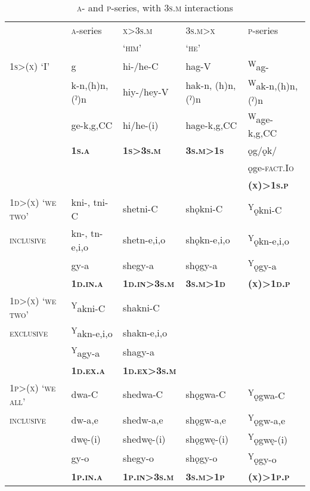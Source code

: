 \begin{table}
\caption{\textsc{a}- and \textsc{p}-series, with \textsc{3s.m} interactions}
\label{figtab:a,o,3s.m interactions}
\small
\begin{tabular}{lllll}
\lsptoprule
 & \textsc{a}-series & \textsc{x}>\textsc{3s.m} & \textsc{3s.m}>\textsc{x}  & \textsc{p}-series\\
 &  & \textsc{`him'} & \textsc{`he'} & \\
\midrule
\textsc{1s>(x) `I'} & g & hi-/he-C & hag-V & \textsuperscript{W}ag-\\
 & k-n,(h)n,(ˀ)n & hiy-/hey-V & hak-n, (h)n, (ˀ)n & \textsuperscript{W}ak-n,(h)n,(ˀ)n \\
 & ge-k,g,CC & hi/he-(i) & hage-k,g,CC & \textsuperscript{W}age-k,g,CC \\
 & \textbf{\textsc{1s.a}} & \textbf{\textsc{1s>3s.m}} & \textbf{\textsc{3s.m>1s}} & ǫg/ǫk/\\
  & & & & ǫge-\textsc{fact.Io}\\
 & & & & \textbf{\textsc{(x)>1s.p}}\\
\midrule
 \textsc{1d>(x) `we two'}& kni-, tni-C & shetni-C & shǫkni-C &  \textsuperscript{Y}ǫkni-C\\
\textsc{inclusive} & kn-, tn-e,i,o & shetn-e,i,o & shǫkn-e,i,o & \textsuperscript{Y}ǫkn-e,i,o \\
 & gy-a & shegy-a & shǫgy-a & \textsuperscript{Y}ǫgy-a\\
 & \textbf{\textsc{1d.in.a}} & \textbf{\textsc{1d.in>3s.m}} & \textbf{\textsc{3s.m>1d}} & \textbf{\textsc{(x)>1d.p}} \\
\cmidrule{1-3}
\textsc{1d>(x) `we two'} & \textsuperscript{Y}akni-C & shakni-C & & \\
\textsc{exclusive} & \textsuperscript{Y}akn-e,i,o & shakn-e,i,o & & \\
 & \textsuperscript{Y}agy-a & shagy-a & & \\
 & \textbf{\textsc{1d.ex.a}} & \textbf{\textsc{1d.ex>3s.m}} & & \\
\midrule
\textsc{1p>(x) `we all'} & dwa-C & shedwa-C & shǫgwa-C & \textsuperscript{Y}ǫgwa-C\\
\textsc{inclusive} & dw-a,e & shedw-a,e & shǫgw-a,e &
\textsuperscript{Y}ǫgw-a,e \\
 & dwę-(i) & shedwę-(i) & shǫgwę-(i) & \textsuperscript{Y}ǫgwę-(i)\\
 & gy-o & shegy-o & shǫgy-o & \textsuperscript{Y}ǫgy-o\\
  & \textbf{\textsc{1p.in.a}} & \textbf{\textsc{1p.in>3s.m}} & \textbf{\textsc{3s.m>1p}} & \textbf{\textsc{(x)>1p.p}}\\

\end{tabular}
\end{table}

